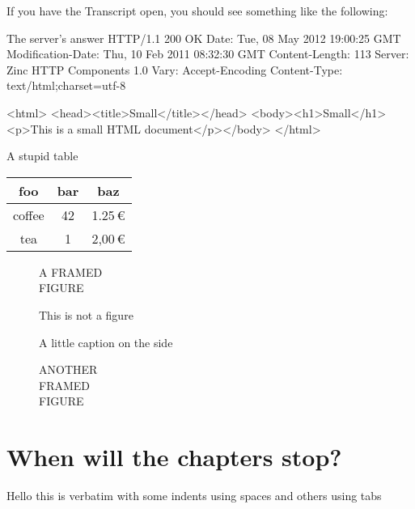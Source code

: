 \documentclass{sbabook}
\begin{document}
If you have the Transcript open, you should see something like the following:

\begin{script}{The server's answer}
HTTP/1.1 200 OK
Date: Tue, 08 May 2012 19:00:25 GMT
Modification-Date: Thu, 10 Feb 2011 08:32:30 GMT
Content-Length: 113
Server: Zinc HTTP Components 1.0
Vary: Accept-Encoding
Content-Type: text/html;charset=utf-8

<html>
<head><title>Small</title></head>
<body><h1>Small</h1><p>This is a small HTML document</p></body>
</html>
\end{script}

\begin{table}[p]
    \begin{sidecaption}{A stupid table}
        \begin{tabular}{ccc}
            \toprule
            foo & bar & baz \\
            \midrule
            coffee & 42 & 1.25\,€ \\
            tea & 1 & 2,00\,€ \\
            \bottomrule
        \end{tabular}
    \end{sidecaption}
\end{table}

\begin{figure}[p]
    \begin{framed}
        A FRAMED\\
        FIGURE
    \end{framed}
    \caption{This is not a figure}
\end{figure}

\begin{figure}[p]
    \begin{sidecaption}{A little caption on the side}
        \begin{shaded}
            ANOTHER\\
            FRAMED\\
            FIGURE
        \end{shaded}
    \end{sidecaption}
\end{figure}


\chapter{When will the chapters stop?}

\begin{boxedverbatim}
Hello
  this is verbatim
with some indents using spaces
	and others using tabs
\end{boxedverbatim}
\end{document}
